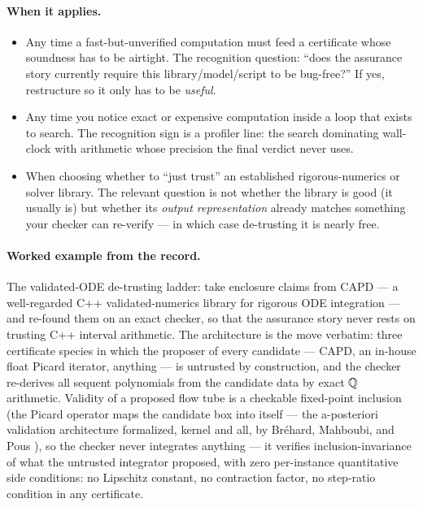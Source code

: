 \paragraph{When it applies.}
\begin{itemize}
\item Any time a fast-but-unverified computation must feed a
  certificate whose soundness has to be airtight. The recognition
  question: ``does the assurance story currently require this
  library/model/script to be bug-free?'' If yes, restructure so it only
  has to be \emph{useful}.
\item Any time you notice exact or expensive computation inside a loop
  that exists to search. The recognition sign is a profiler line: the
  search dominating wall-clock with arithmetic whose precision the
  final verdict never uses.
\item When choosing whether to ``just trust'' an established
  rigorous-numerics or solver library. The relevant question is not
  whether the library is good (it usually is) but whether its
  \emph{output representation} already matches something your checker
  can re-verify --- in which case de-trusting it is nearly free.
\end{itemize}

\paragraph{Worked example from the record.} The validated-ODE
de-trusting ladder: take enclosure claims from CAPD --- a well-regarded
C++ validated-numerics library for rigorous ODE integration --- and
re-found them on an exact checker, so that the assurance story never
rests on trusting C++ interval arithmetic. The architecture is the move
verbatim: three certificate species in which the proposer of every
candidate --- CAPD, an in-house float Picard iterator, anything --- is
untrusted by construction, and the checker re-derives all sequent
polynomials from the candidate data by exact $\mathbb{Q}$ arithmetic. Validity
of a proposed flow tube is a checkable fixed-point inclusion (the
Picard operator maps the candidate box into itself --- the
a-posteriori validation architecture formalized, kernel and all, by
Br\'ehard, Mahboubi, and Pous \cite{lipics-itp-2019-8}), so the
checker never integrates anything --- it verifies inclusion-invariance of what
the untrusted integrator proposed, with zero per-instance quantitative
side conditions: no Lipschitz constant, no contraction factor, no
step-ratio condition in any certificate.

